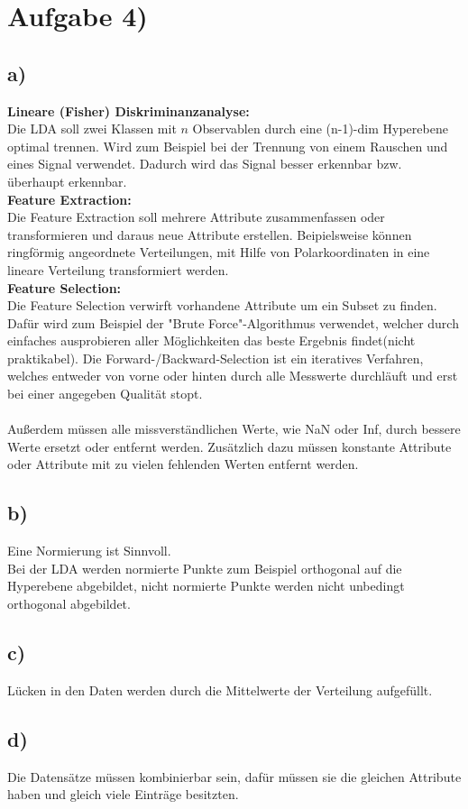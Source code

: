 \section*{Aufgabe 4)}
\subsection*{a)}
\textbf{Lineare (Fisher) Diskriminanzanalyse:} \\
Die LDA soll zwei Klassen mit $n$ Observablen durch eine (n-1)-dim Hyperebene optimal trennen. Wird zum Beispiel bei der Trennung von einem Rauschen und eines Signal verwendet. Dadurch wird das Signal besser erkennbar bzw. überhaupt erkennbar. \\
\textbf{Feature Extraction:} \\
Die Feature Extraction soll mehrere Attribute zusammenfassen oder transformieren und daraus neue Attribute erstellen. Beipielsweise können ringförmig angeordnete Verteilungen, mit Hilfe von Polarkoordinaten in eine lineare Verteilung transformiert werden. \\
\textbf{Feature Selection:} \\
Die Feature Selection verwirft vorhandene Attribute um ein Subset zu finden. Dafür wird zum Beispiel der "Brute Force"-Algorithmus verwendet, welcher durch einfaches ausprobieren aller Möglichkeiten das beste Ergebnis findet(nicht praktikabel). Die Forward-/Backward-Selection ist ein iteratives Verfahren, welches entweder von vorne oder hinten durch alle Messwerte durchläuft und erst bei einer angegeben Qualität stopt. \\
\\
Außerdem müssen alle missverständlichen Werte, wie NaN oder Inf, durch bessere Werte ersetzt oder entfernt werden. Zusätzlich dazu müssen konstante Attribute oder Attribute mit zu vielen fehlenden Werten entfernt werden.



\subsection*{b)}
Eine Normierung ist Sinnvoll. \\
Bei der LDA werden normierte Punkte zum Beispiel orthogonal auf die Hyperebene abgebildet, nicht normierte Punkte werden nicht unbedingt orthogonal abgebildet.



\subsection*{c)}
Lücken in den Daten werden durch die Mittelwerte der Verteilung aufgefüllt.



\subsection*{d)}
Die Datensätze müssen kombinierbar sein, dafür müssen sie die gleichen Attribute haben und gleich viele Einträge besitzten.
